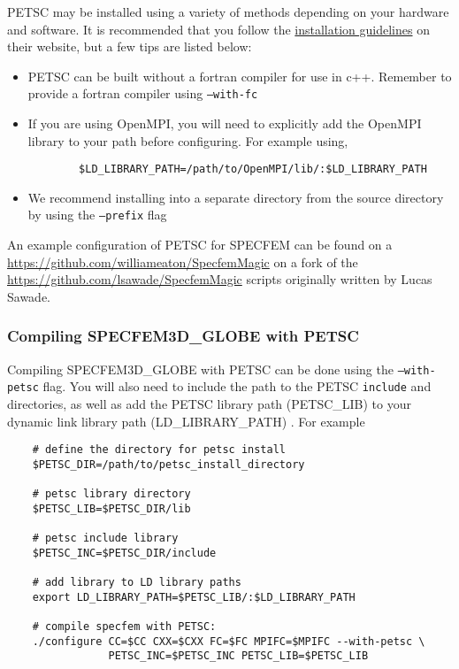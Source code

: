 PETSC may be installed using a variety of methods depending on your hardware and software. It is recommended that you follow
the \href{https://petsc.org/release/install/}{installation guidelines} on their website, but a few tips are listed below: 

\begin{itemize}
    \item PETSC can be built without a fortran compiler for use in c++. Remember to provide a fortran compiler using \texttt{--with-fc} 
    \item If you are using OpenMPI, you will need to explicitly add the OpenMPI library to your path before configuring. For example using, 
    \begin{verbatim}
        $LD_LIBRARY_PATH=/path/to/OpenMPI/lib/:$LD_LIBRARY_PATH
    \end{verbatim}
    \item We recommend installing into a separate directory from the source directory by using the \texttt{--prefix} flag
\end{itemize}

An example configuration of PETSC for SPECFEM can be found on a \href{here}{https://github.com/williameaton/SpecfemMagic} 
on a fork of the \href{SpecfemMagic}{https://github.com/lsawade/SpecfemMagic} scripts originally written by Lucas Sawade. 


\subsubsection{Compiling SPECFEM3D_GLOBE with PETSC}

Compiling SPECFEM3D_GLOBE with PETSC can be done using the \texttt{--with-petsc} flag. You will also need to include the 
path to the PETSC \texttt{include} and  directories, as well as add the PETSC library path (PETSC_LIB) to your
dynamic link library path (LD_LIBRARY_PATH) . For example 
\begin{verbatim}
    # define the directory for petsc install 
    $PETSC_DIR=/path/to/petsc_install_directory

    # petsc library directory
    $PETSC_LIB=$PETSC_DIR/lib

    # petsc include library 
    $PETSC_INC=$PETSC_DIR/include

    # add library to LD library paths 
    export LD_LIBRARY_PATH=$PETSC_LIB/:$LD_LIBRARY_PATH

    # compile specfem with PETSC: 
    ./configure CC=$CC CXX=$CXX FC=$FC MPIFC=$MPIFC --with-petsc \ 
                PETSC_INC=$PETSC_INC PETSC_LIB=$PETSC_LIB
\end{verbatim}



